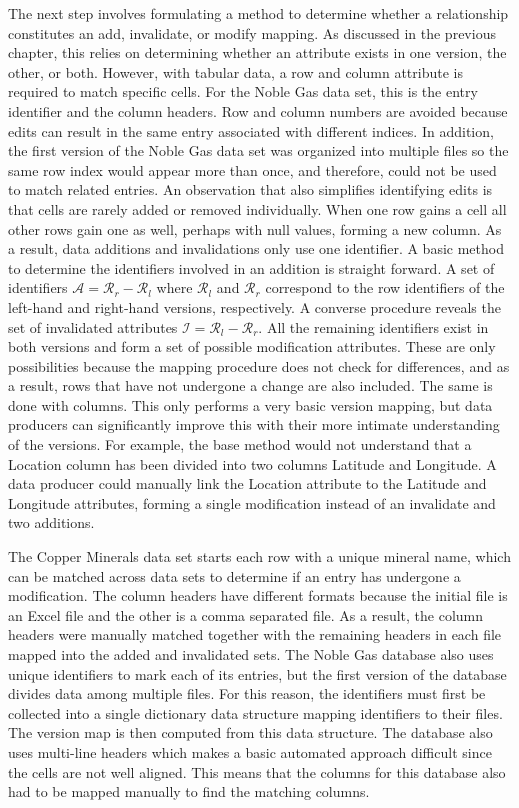 The next step involves formulating a method to determine whether a relationship constitutes an add, invalidate, or modify mapping.
As discussed in the previous chapter, this relies on determining whether an attribute exists in one version, the other, or both.
However, with tabular data, a row and column attribute is required to match specific cells.
For the Noble Gas data set, this is the entry identifier and the column headers.
Row and column numbers are avoided because edits can result in the same entry associated with different indices.
In addition, the first version of the Noble Gas data set was organized into multiple files so the same row index would appear more than once, and therefore, could not be used to match related entries.
An observation that also simplifies identifying edits is that cells are rarely added or removed individually.
When one row gains a cell all other rows gain one as well, perhaps with null values, forming a new column.
As a result, data additions and invalidations only use one identifier.
A basic method to determine the identifiers involved in an addition is straight forward.
A set of identifiers \(\mathcal{A} = \mathcal{R}_{r} - \mathcal{R}_{l}\) where \(\mathcal{R}_{l}\) and \(\mathcal{R}_{r}\) correspond to the row identifiers of the left-hand and right-hand versions, respectively.
A converse procedure reveals the set of invalidated attributes \(\mathcal{I} = \mathcal{R}_{l} - \mathcal{R}_{r}\).
All the remaining identifiers exist in both versions and form a set of possible modification attributes.
These are only possibilities because the mapping procedure does not check for differences, and as a result, rows that have not undergone a change are also included.
The same is done with columns.
This only performs a very basic version mapping, but data producers can significantly improve this with their more intimate understanding of the versions.
For example, the base method would not understand that a Location column has been divided into two columns Latitude and Longitude.
A data producer could manually link the Location attribute to the Latitude and Longitude attributes, forming a single modification instead of an invalidate and two additions.

The Copper Minerals data set starts each row with a unique mineral name, which can be matched across data sets to determine if an entry has undergone a modification.
The column headers have different formats because the initial file is an Excel file and the other is a comma separated file.
As a result, the column headers were manually matched together with the remaining headers in each file mapped into the added and invalidated sets.
The Noble Gas database also uses unique identifiers to mark each of its entries, but the first version of the database divides data among multiple files.
For this reason, the identifiers must first be collected into a single dictionary data structure mapping identifiers to their files.
The version map is then computed from this data structure.
The database also uses multi-line headers which makes a basic automated approach difficult since the cells are not well aligned.
This means that the columns for this database also had to be mapped manually to find the matching columns.

